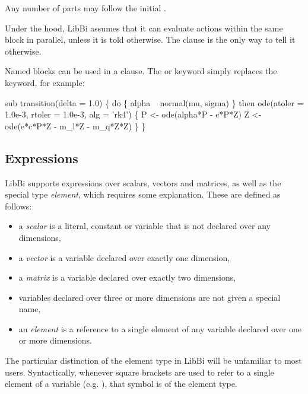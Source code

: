 Any number of  parts may follow the initial .

Under the hood, LibBi assumes that it can evaluate actions within the same block
in parallel, unless it is told otherwise. The  clause is the
only way to tell it otherwise.

Named blocks can be used in a  clause. The  or
 keyword simply replaces the  keyword, for example:
\begin{bicode}
sub transition(delta = 1.0) \{
  do \{
    alpha ~ normal(mu, sigma)
  \} then ode(atoler = 1.0e-3, rtoler = 1.0e-3, alg = 'rk4') \{
    P <- ode(alpha*P - c*P*Z)
    Z <- ode(e*c*P*Z - m_l*Z - m_q*Z*Z)
  \}
\}
\end{bicode}

\subsection{Expressions\label{Expressions}}

LibBi supports expressions over scalars, vectors and matrices, as well as the
special type \textit{element}, which requires some explanation. These are
defined as follows:
\begin{itemize}
\item a \textit{scalar} is a literal, constant or variable that
  is not declared over any dimensions,
\item a \textit{vector} is a variable declared over
  exactly one dimension,
\item a \textit{matrix} is a variable declared over exactly two
  dimensions,
\item variables declared over three or more dimensions are not given a special
  name,
\item an \textit{element} is a reference to a single element of any
  variable declared over one or more dimensions.
\end{itemize}

The particular distinction of the element type in LibBi will be unfamiliar to
most users. Syntactically, whenever square brackets are used to refer to a
single element of a variable (e.g. ), that symbol is of the
element type.

